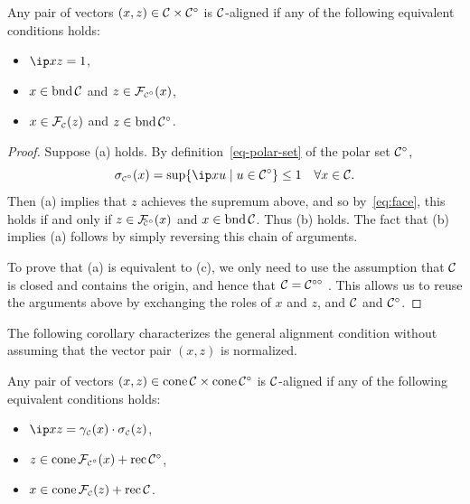 \begin{proposition}
  \label{prop-normalized-alignment}
  Any pair of vectors $(x,z)\in\mathcal{C}\times\mathcal{C}^\circ$ is $\mathcal{C}$-aligned if any
  of the following equivalent conditions holds:
  \begin{itemize}
  \item $\ip x z = 1$,
  \item $x\in\operatorname{bnd}\mathcal{C}$ and $z\in\mathcal{F}_{\scriptscriptstyle\mathcal{C}^\circ}(x)$,
  \item $x\in\mathcal{F}_{\scriptscriptstyle\mathcal{C}}(z)$ and $z\in\operatorname{bnd}\mathcal{C}^\circ$.
  \end{itemize}
\end{proposition}

\begin{proof}
  Suppose (a) holds. By definition~\eqref{eq-polar-set} of
  the polar set $\mathcal{C}^\circ$,
  \[
    \sigma\Csp(x) = \sup\{\ip x u \mid u\in\Cscr\polar\}\le1
    \quad\forall x\in\Cscr.
  \]
  Then (a) implies that $z$ achieves the supremum above, and so
  by~\eqref{eq:face}, this holds if and only if $z\in\mathcal{F}_{\!\!\scriptscriptstyle\mathcal{C}^\circ}(x)$ and $x\in\operatorname{bnd}\mathcal{C}$.
  Thus (b) holds. The fact that (b) implies (a) follows by simply
  reversing this chain of arguments.

  To prove that (a) is equivalent to (c), we only need to use the assumption
  that $\mathcal{C}$ is closed and contains the origin, and hence that
  $\mathcal{C}=\mathcal{C}^{\circ\circ}$ \cite[Theorem~14.5]{rockafellar1970convex}. This
  allows us to reuse the arguments above by exchanging the roles of $x$ and $z$,
  and $\mathcal{C}$ and $\mathcal{C}^\circ$.
\end{proof}

The following corollary characterizes the general alignment condition
without assuming that the vector pair $(x,z)$ is normalized.

\begin{corollary}[Alignment] \label{cor-general-alignment} Any pair of vectors
  $(x,z)\in\operatorname{cone}\mathcal{C}\times\operatorname{cone}\mathcal{C}^\circ$ is $\mathcal{C}$-aligned if any of the
  following equivalent conditions holds:
    \begin{itemize}
    \item\label{cor-general-pi} $\ip x z = \gauge\Cs(x)\cdot\sigma\Cs(z)$,
    \item $z \in \operatorname{cone}\mathcal{F}_{\scriptscriptstyle\mathcal{C}^\circ}(x) + \operatorname{rec}\mathcal{C}^\circ$,
    \item $x \in \operatorname{cone}\mathcal{F}_{\scriptscriptstyle\mathcal{C}}(z) + \operatorname{rec}\mathcal{C}$.
    \end{itemize}
\end{corollary}

